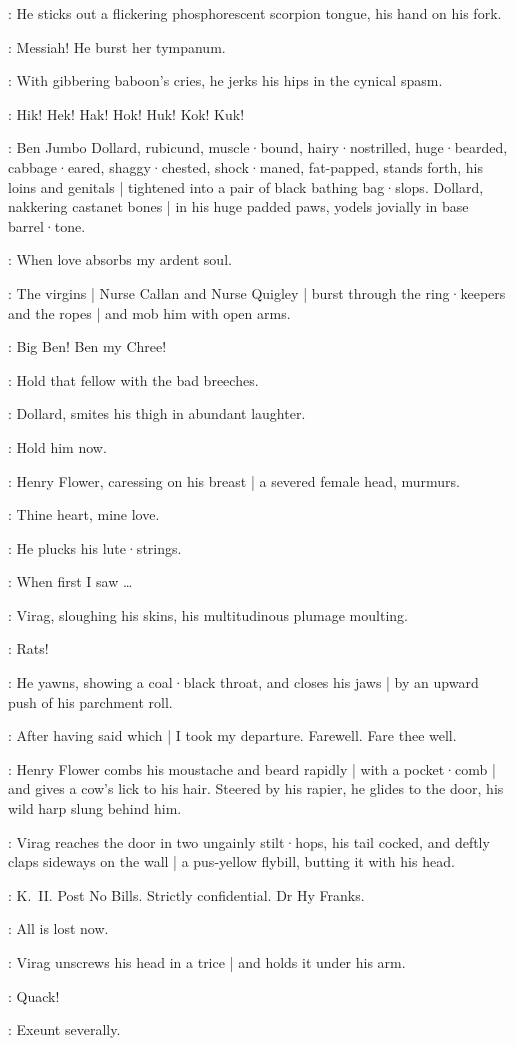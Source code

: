 :
He sticks out a flickering phosphorescent scorpion tongue,
his hand on his fork.

\Virag:
Messiah!
He burst her tympanum.

:
With gibbering baboon's cries,
he jerks his hips in the cynical spasm.

\Virag:
Hik!
Hek!
Hak!
Hok!
Huk!
Kok!
Kuk!

:
Ben Jumbo Dollard,
rubicund,
muscle·bound,
hairy·nostrilled,
huge·bearded,
cabbage·eared,
shaggy·chested,
shock·maned,
fat-papped,
stands forth,
his loins and genitals |
tightened into a pair of black bathing bag·slops.
Dollard,
nakkering castanet bones |
in his huge padded paws,
yodels jovially in base barrel·tone.

\BenDollard:
When love absorbs my ardent soul.

:
The virgins |
Nurse Callan and Nurse Quigley |
burst through the ring·keepers and the ropes |
and mob him with open arms.

\Virgins:
Big Ben!
Ben my Chree!

\Voice:
Hold that fellow with the bad breeches.

:
Dollard,
smites his thigh in abundant laughter.

\BenDollard:
Hold him now.

:
Henry Flower,
caressing on his breast |
a severed female head,
murmurs.

\Henry:
Thine heart,
mine love.

:
He plucks his lute·strings.

\Henry:
When first I saw \ldots

:
Virag,
sloughing his skins,
his multitudinous plumage moulting.

\Virag:
Rats!

:
He yawns,
showing a coal·black throat,
and closes his jaws |
by an upward push of his parchment roll.

\Virag:
After having said which |
I took my departure.
Farewell.
Fare thee well.

:
Henry Flower combs his moustache and beard rapidly |
with a pocket·comb |
and gives a cow's lick to his hair.
Steered by his rapier,
he glides to the door,
his wild harp slung behind him.

:
Virag reaches the door in two ungainly stilt·hops,
his tail cocked,
and deftly claps sideways on the wall |
a pus-yellow flybill,
butting it with his head.

\Flybill[2]:
K.~II.
Post No Bills.
Strictly confidential.
Dr Hy Franks.

\Henry:
All is lost now.

:
Virag unscrews his head in a trice |
and holds it under his arm.

\ViragsHead:
Quack!

\All:
Exeunt severally.


